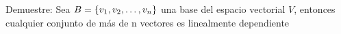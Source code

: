 %
%
%
%
%
%

\begin{enumerate}
\begin{prob}[]
Demuestre:
Sea $B= \lbrace v_1, v_2, \ldots, v_n \rbrace$ una base del espacio vectorial $V$, entonces cualquier conjunto de m\'as de n vectores es linealmente dependiente
\end{prob}

\end{enumerate}
